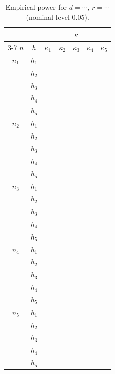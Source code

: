 \documentclass{article}
\begin{document}
\begin{table}[ht]
\centering
\caption{Empirical power for $d=\cdots$, $r=\cdots$ (nominal level $0.05$).}
\begin{tabular}{ccccccc}
\toprule
 &  & \multicolumn{5}{c}{$\kappa$} \\
\cmidrule(lr){3-7}
$n$ & $h$ 
& $\kappa_1$ & $\kappa_2$ & $\kappa_3$ & $\kappa_4$ & $\kappa_5$ \\
\midrule

$n_1$ & $h_1$ &  &  &  &  &  \\
      & $h_2$ &  &  &  &  &  \\
      & $h_3$ &  &  &  &  &  \\
      & $h_4$ &  &  &  &  &  \\
      & $h_5$ &  &  &  &  &  \\
\midrule

$n_2$ & $h_1$ &  &  &  &  &  \\
      & $h_2$ &  &  &  &  &  \\
      & $h_3$ &  &  &  &  &  \\
      & $h_4$ &  &  &  &  &  \\
      & $h_5$ &  &  &  &  &  \\
\midrule

$n_3$ & $h_1$ &  &  &  &  &  \\
      & $h_2$ &  &  &  &  &  \\
      & $h_3$ &  &  &  &  &  \\
      & $h_4$ &  &  &  &  &  \\
      & $h_5$ &  &  &  &  &  \\
\midrule

$n_4$ & $h_1$ &  &  &  &  &  \\
      & $h_2$ &  &  &  &  &  \\
      & $h_3$ &  &  &  &  &  \\
      & $h_4$ &  &  &  &  &  \\
      & $h_5$ &  &  &  &  &  \\
\midrule

$n_5$ & $h_1$ &  &  &  &  &  \\
      & $h_2$ &  &  &  &  &  \\
      & $h_3$ &  &  &  &  &  \\
      & $h_4$ &  &  &  &  &  \\
      & $h_5$ &  &  &  &  &  \\

\bottomrule
\end{tabular}
\end{table}
\end{document}

